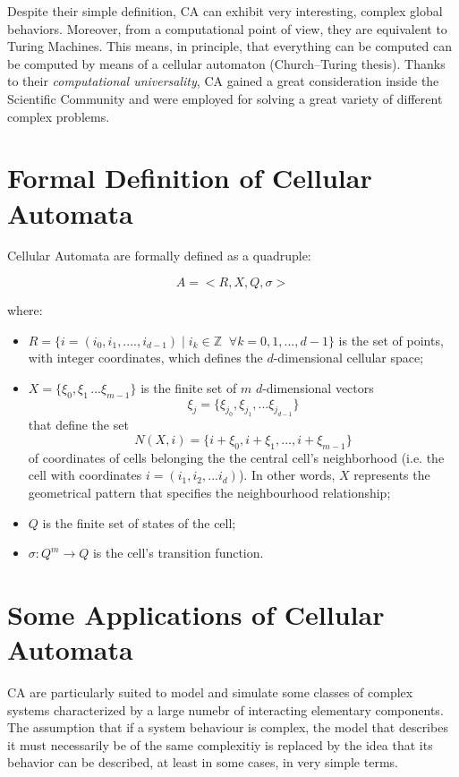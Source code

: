 Despite their simple definition, CA can exhibit very interesting,
complex global behaviors. Moreover, from a computational point of
view, they are equivalent to Turing Machines. This means, in
principle, that everything can be computed can be computed by means of
a cellular automaton (Church–Turing thesis). Thanks to their
\emph{computational universality}, CA gained a great consideration
inside the Scientific Community and were employed for solving a great
variety of different complex problems.

\section{Formal Definition of Cellular Automata}

Cellular Automata are formally defined as a quadruple:

$$A = <R,X,Q,\sigma>$$

\noindent where:

\begin{itemize}
\item $R = \{i = (i_0,i_1,....,i_{d-1}) \; | \; i_k \in \mathbb{Z} \;\; \forall k =
  0,1,...,d-1\}$ is the set of points, with integer coordinates, which
  defines the $d$-dimensional cellular space;

\item $X = \{\xi_0,\xi_1\,...\xi_{m-1}\}$ is the finite set of $m$
  $d$-dimensional vectors
  \[ \xi_j = \{\xi_{j_0},\xi_{j_1},...\xi_{j_{d-1}}\} \]
  that define the set
  \[ N(X,i) = \{i + \xi_0,i + \xi_1,...,i + \xi_{m-1}\} \]
  of coordinates of cells belonging the the central cell's
  neighborhood (i.e. the cell with coordinates $i =
  (i_1,i_2,...i_d)$). In other words, $X$ represents the geometrical
  pattern that specifies the neighbourhood relationship;
  
\item $Q$ is the finite set of states of the cell;
  
\item $\sigma : Q^m \rightarrow Q$ is the cell's transition function.

\end{itemize}


\section{Some Applications of Cellular Automata}

CA are particularly suited to model and simulate some classes of
complex systems characterized by a large numebr of interacting
elementary components.  The assumption that if a system behaviour is
complex, the model that describes it must necessarily be of the same
complexitiy is replaced by the idea that its behavior can be
described, at least in some cases, in very simple terms.

